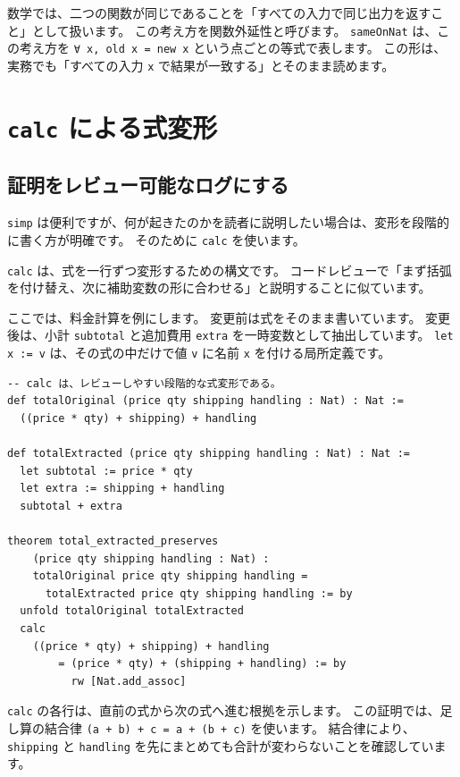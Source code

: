 数学では、二つの関数が同じであることを「すべての入力で同じ出力を返すこと」として扱います。
この考え方を関数外延性と呼びます。
\texttt{sameOnNat} は、この考え方を \texttt{∀ x, old x = new x} という点ごとの等式で表します。
この形は、実務でも「すべての入力 \texttt{x} で結果が一致する」とそのまま読めます。

\section{\texttt{calc} による式変形}

\subsection{証明をレビュー可能なログにする}

\texttt{simp} は便利ですが、何が起きたのかを読者に説明したい場合は、変形を段階的に書く方が明確です。
そのために \texttt{calc} を使います。

\texttt{calc} は、式を一行ずつ変形するための構文です。
コードレビューで「まず括弧を付け替え、次に補助変数の形に合わせる」と説明することに似ています。

ここでは、料金計算を例にします。
変更前は式をそのまま書いています。
変更後は、小計 \texttt{subtotal} と追加費用 \texttt{extra} を一時変数として抽出しています。
\texttt{let x := v} は、その式の中だけで値 \texttt{v} に名前 \texttt{x} を付ける局所定義です。

\begin{listing}[htbp]
\begin{verbatim}
-- calc は、レビューしやすい段階的な式変形である。
def totalOriginal (price qty shipping handling : Nat) : Nat :=
  ((price * qty) + shipping) + handling

def totalExtracted (price qty shipping handling : Nat) : Nat :=
  let subtotal := price * qty
  let extra := shipping + handling
  subtotal + extra

theorem total_extracted_preserves
    (price qty shipping handling : Nat) :
    totalOriginal price qty shipping handling =
      totalExtracted price qty shipping handling := by
  unfold totalOriginal totalExtracted
  calc
    ((price * qty) + shipping) + handling
        = (price * qty) + (shipping + handling) := by
          rw [Nat.add_assoc]
\end{verbatim}
\caption{\texttt{total\_extracted\_preserves}}
\label{lst:ch09_calc_extract}
\end{listing}

\texttt{calc} の各行は、直前の式から次の式へ進む根拠を示します。
この証明では、足し算の結合律 \texttt{(a + b) + c = a + (b + c)} を使います。
結合律により、\texttt{shipping} と \texttt{handling} を先にまとめても合計が変わらないことを確認しています。

